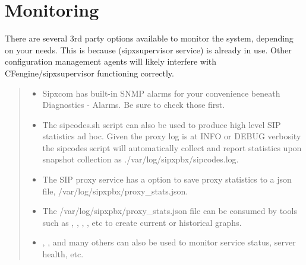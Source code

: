 \documentclass[letterpaper,10pt,english]{sphinxmanual}
\begin{document}
\chapter{Monitoring}
\label{\detokenize{monitoring:monitoring}}\label{\detokenize{monitoring::doc}}
There are several 3rd party options available to monitor the system, depending on your needs.  This is because  (sipxsupervisor service) is already in use. Other configuration management agents will likely interfere with CFengine/sipxsupervisor functioning correctly.
\begin{quote}
\begin{itemize}
\item {} 
Sipxcom has built-in SNMP alarms for your convenience beneath Diagnostics - Alarms. Be sure to check those first.

\item {} 
The sipcodes.sh script can also be used to produce high level SIP statistics ad hoc. Given the proxy log is at INFO or DEBUG verbosity the sipcodes script will automatically collect and report statistics upon snapshot collection as ./var/log/sipxpbx/sipcodes.log.

\item {} 
The SIP proxy service has a option to save proxy statistics to a json file, /var/log/sipxpbx/proxy\_stats.json.

\end{itemize}

\begin{itemize}
\item {} 
The /var/log/sipxpbx/proxy\_stats.json file can be consumed by tools such as  , , , , etc to create current or historical graphs.

\item {} 
 , ,  and many others can also be used to monitor service status, server health, etc.

\end{itemize}
\end{quote}
\end{document}

